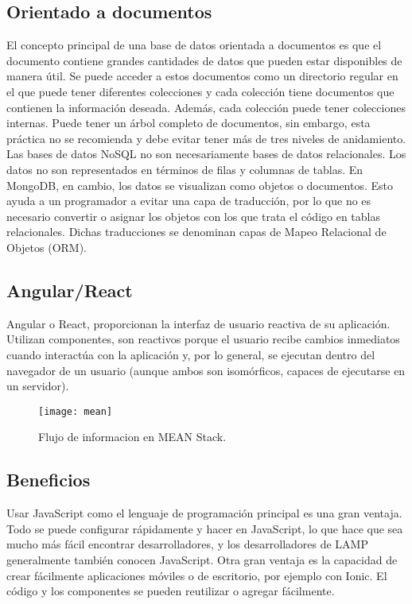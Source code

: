 \subsection{Orientado a documentos}
El concepto principal de una base de datos orientada a documentos es que el documento contiene grandes cantidades de datos que pueden estar disponibles de manera útil. Se puede acceder a estos documentos como un directorio regular en el que puede tener diferentes colecciones y cada colección tiene documentos que contienen la información deseada. Además, cada colección puede tener colecciones internas. Puede tener un árbol completo de documentos, sin embargo, esta práctica no se recomienda y debe evitar tener más de tres niveles de anidamiento. \\[0.8cm]
Las bases de datos NoSQL no son necesariamente bases de datos relacionales. Los datos no son representados en términos de filas y columnas de tablas. En MongoDB, en cambio, los datos se visualizan como objetos o documentos. Esto ayuda a un programador a evitar una capa de traducción, por lo que no es necesario convertir o asignar los objetos con los que trata el código en tablas relacionales. Dichas traducciones se denominan capas de Mapeo Relacional de Objetos (ORM).
\subsection{Angular/React}
Angular o React, proporcionan la interfaz de usuario reactiva de su aplicación. Utilizan componentes, son reactivos porque el usuario recibe cambios inmediatos cuando interactúa con la aplicación y, por lo general, se ejecutan dentro del navegador de un usuario (aunque ambos son isomórficos, capaces de ejecutarse en un servidor). \\[0.8cm]

\begin{figure}[h]
  \centering
  \texttt{[image: mean]}
  \caption{Flujo de informacion en MEAN Stack.}
\end{figure}

\subsection{Beneficios}
Usar JavaScript como el lenguaje de programación principal es una gran ventaja. Todo se puede configurar rápidamente y hacer en JavaScript, lo que hace que sea mucho más fácil encontrar desarrolladores, y los desarrolladores de LAMP generalmente también conocen JavaScript. Otra gran ventaja es la capacidad de crear fácilmente aplicaciones móviles o de escritorio, por ejemplo con Ionic. El código y los componentes se pueden reutilizar o agregar fácilmente.
